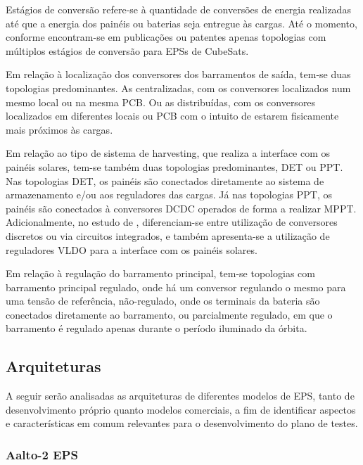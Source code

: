 Estágios de conversão refere-se à quantidade de conversões de energia realizadas até que a energia dos painéis ou baterias seja entregue às cargas. Até o momento, conforme \textcite{comprehensive-review-eps} encontram-se em publicações ou patentes apenas topologias com múltiplos estágios de conversão para \gls{EPS}s de CubeSats.

Em relação à localização dos conversores dos barramentos de saída, tem-se duas topologias predominantes.
As centralizadas, com os conversores localizados num mesmo local ou na mesma PCB.
Ou as distribuídas, com os conversores localizados em diferentes locais ou PCB com o intuito de estarem fisicamente mais próximos às cargas.

Em relação ao tipo de sistema de harvesting, que realiza a interface com os painéis solares, tem-se também duas topologias predominantes, \gls{DET} ou \gls{PPT}.
Nas topologias \gls{DET}, os painéis são conectados diretamente ao sistema de armazenamento e/ou aos reguladores das cargas.
Já nas topologias \gls{PPT}, os painéis são conectados à conversores \gls{DCDC} operados de forma a realizar \gls{MPPT}.
Adicionalmente, no estudo de \textcite{sara-review-eps}, diferenciam-se entre utilização de conversores discretos ou via circuitos integrados, e também apresenta-se a utilização de reguladores \gls{VLDO} para a interface com os painéis solares.

Em relação à regulação do barramento principal, tem-se topologias com barramento principal regulado, onde há um conversor regulando o mesmo para uma tensão de referência, não-regulado, onde os terminais da bateria são conectados diretamente ao barramento, ou parcialmente regulado, em que o barramento é regulado apenas durante o período iluminado da órbita.



\subsection{Arquiteturas}\label{sec:arquiteturas}

A seguir serão analisadas as arquiteturas de diferentes modelos de \gls{EPS}, tanto de desenvolvimento próprio quanto modelos comerciais, a fim de identificar aspectos e características em comum relevantes para o desenvolvimento do plano de testes.

\subsubsection{Aalto-2 EPS}

